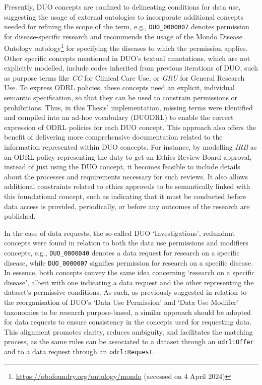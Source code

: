 Presently, DUO concepts are confined to delineating conditions for data use, suggesting the usage of external ontologies to incorporate additional concepts needed for refining the scope of the term, e.g., \texttt{DUO\_0000007} denotes permission for disease-specific research and recommends the usage of the Mondo Disease Ontology ontology\footnote{\url{https://obofoundry.org/ontology/mondo} (accessed on 4 April 2024)} for specifying the diseases to which the permission applies. 
Other specific concepts mentioned in DUO's textual annotations, which are not explicitly modelled, include codes inherited from previous iterations of DUO, such as purpose terms like \textit{CC} for Clinical Care Use, or \textit{GRU} for General Research Use.
To express ODRL policies, these concepts need an explicit, individual semantic specification, so that they can be used to constrain permissions or prohibitions.
Thus, in this Thesis' implementation, missing terms were identified and compiled into an ad-hoc vocabulary (DUODRL) to enable the correct expression of ODRL policies for each DUO concept.
This approach also offers the benefit of delivering more comprehensive documentation related to the information represented within DUO concepts.
For instance, by modelling \textit{IRB} as an ODRL policy representing the duty to get an Ethics Review Board approval, instead of just using the DUO concept, it becomes feasible to include details about the processes and requirements necessary for such reviews.
It also allows additional constraints related to ethics approvals to be semantically linked with this foundational concept, such as indicating that it must be conducted before data access is provided, periodically, or before any outcomes of the research are published.

In the case of data requests, the so-called DUO `Investigations', redundant concepts were found in relation to both the data use permissions and modifiers concepts, e.g., \texttt{DUO\_0000040} denotes a data request for research on a specific disease, while \texttt{DUO\_0000007} signifies permission for research on a specific disease.
In essence, both concepts convey the same idea concerning `research on a specific disease', albeit with one indicating a data request and the other representing the dataset's permissive conditions.
As such, as previously suggested in relation to the reorganisation of DUO's `Data Use Permission' and `Data Use Modifier' taxonomies to be research purpose-based, a similar approach should be adopted for data requests to ensure consistency in the concepts used for requesting data.
This alignment promotes clarity, reduces ambiguity, and facilitates the matching process, as the same rules can be associated to a dataset through an \texttt{odrl:Offer} and to a data request through an \texttt{odrl:Request}.

